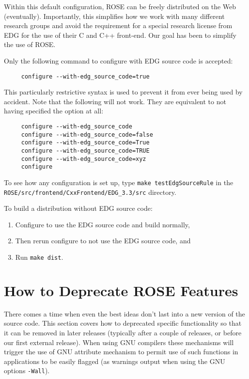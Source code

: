   Within this default configuration, ROSE can be freely distributed on the Web
(eventually).  Importantly, this simplifies how we work with many different 
research groups and avoid the requirement for a special research license from
EDG for the use of their C and C++ front-end.  Our goal has been to simplify
the use of ROSE.

   Only the following command to configure with EDG source code is accepted:
{\indent
{\mySmallFontSize
\begin{verbatim}
     configure --with-edg_source_code=true
\end{verbatim} 
}}
This particularly restrictive syntax is used to prevent it from ever being used
by accident.  Note that the following will not work. They are equivalent to 
not having specified the option at all:
{\indent
{\mySmallFontSize
\begin{verbatim}
     configure --with-edg_source_code
     configure --with-edg_source_code=false
     configure --with-edg_source_code=True
     configure --with-edg_source_code=TRUE
     configure --with-edg_source_code=xyz
     configure 
\end{verbatim} 
}}

To see how any configuration is set up, type {\tt make testEdgSourceRule}
in the {\tt ROSE/src/frontend/CxxFrontend/EDG\_3.3/src} directory.

To build a distribution without EDG source code:
\begin{enumerate}
   \item Configure to use the EDG source code and build normally, 
   \item Then rerun configure to not use the EDG source code, and
   \item Run {\tt make dist}.
\end{enumerate}


\section{How to Deprecate ROSE Features}

    There comes a time when even the best ideas don't last
into a new version of the source code.  This section covers how to
deprecated specific functionality so that it can be removed in
later releases (typically after a couple of releases, or before
our first external release).  When using GNU compilers these mechanisms
will trigger the use of GNU attribute mechanism to permit use of such
functions in applications to be easily flagged (as warnings
output when using the GNU options {\tt -Wall}).

